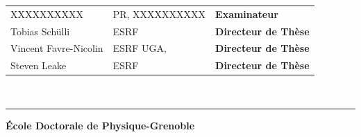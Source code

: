 \documentclass[12pt]{book}
\begin{document}
\begin{titlepage}
\begin{center}
\begin{tabular}{lll}
		XXXXXXXXXX & PR, XXXXXXXXXX & \textbf{Examinateur} \\
		
		Tobias Sch\"ulli &  ESRF & \textbf{Directeur de Thèse}\\
		Vincent Favre-Nicolin &  ESRF UGA, & \textbf{Directeur de Thèse}\\
		Steven Leake &  ESRF & \textbf{Directeur de Thèse}

	\end{tabular}\\[1cm]
\end{center}
\hrule

{\small \bfseries
École Doctorale de Physique-Grenoble}

\newpage
\end{titlepage}



\pagestyle{fancy}

\fancyhead{}

\renewcommand{\chaptermark}[1]{\markboth{\textsc{#1}}{}}

\frontmatter



%
%


\tableofcontents
\clearpage





\setlength{\parskip}{.7em}

\titlespacing*{\section}{0pt}{.9em}{.8em}
\renewcommand{\baselinestretch}{1.1}



 
\end{document}
